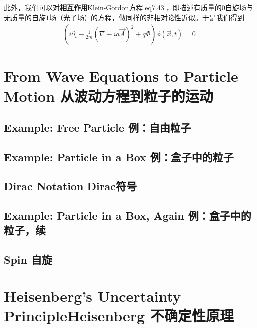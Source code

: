 此外，我们可以对{\bf 相互作用}Klein-Gordon方程\eqref{eq7.43}，即描述有质量的$0$自旋场与无质量的自旋$1$场（光子场）的方程，做同样的非相对论性近似。于是我们得到
\begin{align}
\left(i\partial_t-\frac{1}{2m}\left(\nabla-ia\vec{A}\right)^2+q\Phi\right)\phi(\vec{x},t)=0
\end{align}

\section[从波动方程到粒子的运动]{From Wave Equations to Particle Motion 从波动方程到粒子的运动}\label{sec8.5}
\subsection[例：自由粒子]{Example: Free Particle 例：自由粒子}\label{sec8.5.1}
\subsection[例：盒子中的粒子]{Example: Particle in a Box 例：盒子中的粒子}\label{sec8.5.2}
\subsection[Dirac符号]{Dirac Notation Dirac符号}\label{sec8.5.3}
\subsection[例：盒子中的粒子，续]{Example: Particle in a Box, Again 例：盒子中的粒子，续}\label{sec8.5.4}
\subsection[自旋]{Spin 自旋}\label{sec8.5.5}
\section[Heisenberg 不确定性原理]{Heisenberg’s Uncertainty PrincipleHeisenberg 不确定性原理}\label{sec8.6}

